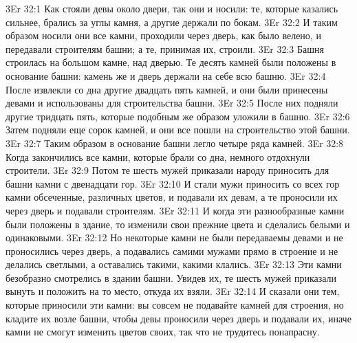 \vs 3Er 32:1
Как стояли девы около
двери, так они и носили: те, которые казались сильнее, брались за углы камня,
а другие держали по бокам.
\vs 3Er 32:2
И таким образом носили они
все камни, проходили через дверь, как было велено, и передавали строителям
башни; а те, принимая их, строили.
\vs 3Er 32:3
Башня строилась на большом
камне, над дверью. Те десять камней были положены в основание башни: камень же
и дверь держали на себе всю башню.
\vs 3Er 32:4
После извлекли со дна
другие двадцать пять камней, и они были принесены девами и использованы для
строительства башни.
\vs 3Er 32:5
После них подняли другие
тридцать пять, которые подобным же образом уложили в башню.
\vs 3Er 32:6
Затем подняли еще сорок
камней, и они все пошли на строительство этой башни.
\vs 3Er 32:7
Таким образом в основание
башни легло четыре ряда камней.
\vs 3Er 32:8
Когда закончились все
камни, которые брали со дна, немного отдохнули строители.
\vs 3Er 32:9
Потом те шесть мужей
приказали народу приносить для башни камни с двенадцати гор.
\vs 3Er 32:10
И стали мужи приносить со
всех гор камни обсеченные, различных цветов, и подавали их девам, а те
проносили их через дверь и подавали строителям.
\vs 3Er 32:11
И когда эти разнообразные
камни были положены в здание, то изменили свои прежние цвета и сделались
белыми и одинаковыми.
\vs 3Er 32:12
Но некоторые камни не
были передаваемы девами и не проносились через дверь, а подавались самими
мужами прямо в строение и не делались светлыми, а оставались такими, какими
клались.
\vs 3Er 32:13
Эти камни безобразно
смотрелись в здании башни. Увидев их, те шесть мужей приказали вынуть и
положить на то место, откуда их взяли.
\vs 3Er 32:14
И сказали они тем,
которые приносили эти камни: вы совсем не подавайте камней для строения, но
кладите их возле башни, чтобы девы проносили через дверь и подавали их, иначе
камни не смогут изменить цветов своих, так что не трудитесь понапрасну.

